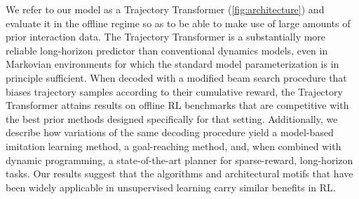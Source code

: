 We refer to our model as a Trajectory Transformer (\autoref{fig:architecture}) and evaluate it in the offline regime so as to be able to make use of large amounts of prior interaction data.
The Trajectory Transformer is a substantially more reliable long-horizon predictor than conventional dynamics models, even in Markovian environments for which the standard model parameterization is in principle sufficient.
When decoded with a modified beam search procedure that biases trajectory samples according to their cumulative reward, the Trajectory Transformer attains results on offline RL benchmarks that are competitive with the best prior methods designed specifically for that setting.
Additionally, we describe how variations of the same decoding procedure yield a model-based imitation learning method, a goal-reaching method, and, when combined with dynamic programming, a state-of-the-art planner for sparse-reward, long-horizon tasks.
Our results suggest that the algorithms and architectural motifs that have been widely applicable in unsupervised learning carry similar benefits in RL.

